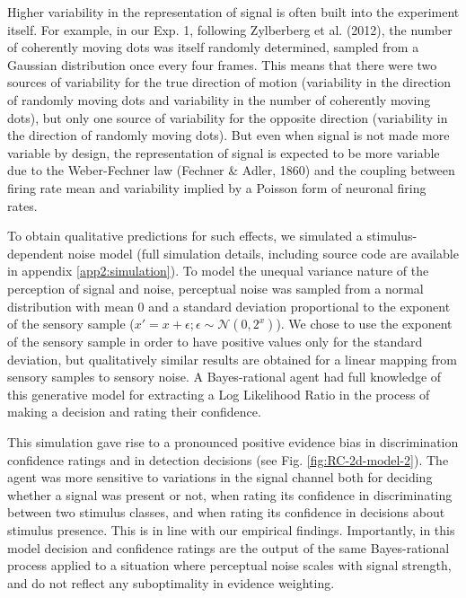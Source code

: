 \documentclass[12pt,twoside]{reedthesis}
\begin{document}
Higher variability in the representation of signal is often built into the experiment itself. For example, in our Exp. 1, following Zylberberg et al. (2012), the number of coherently moving dots was itself randomly determined, sampled from a Gaussian distribution once every four frames. This means that there were two sources of variability for the true direction of motion (variability in the direction of randomly moving dots and variability in the number of coherently moving dots), but only one source of variability for the opposite direction (variability in the direction of randomly moving dots). But even when signal is not made more variable by design, the representation of signal is expected to be more variable due to the Weber-Fechner law (Fechner \& Adler, 1860) and the coupling between firing rate mean and variability implied by a Poisson form of neuronal firing rates.

To obtain qualitative predictions for such effects, we simulated a stimulus-dependent noise model (full simulation details, including source code are available in appendix \ref{app2:simulation}). To model the unequal variance nature of the perception of signal and noise, perceptual noise was sampled from a normal distribution with mean 0 and a standard deviation proportional to the exponent of the sensory sample (\(x'=x+\epsilon; \epsilon \sim \mathcal{N}(0,2^x)\)). We chose to use the exponent of the sensory sample in order to have positive values only for the standard deviation, but qualitatively similar results are obtained for a linear mapping from sensory samples to sensory noise. A Bayes-rational agent had full knowledge of this generative model for extracting a Log Likelihood Ratio in the process of making a decision and rating their confidence.

This simulation gave rise to a pronounced positive evidence bias in discrimination confidence ratings and in detection decisions (see Fig. \ref{fig:RC-2d-model-2}). The agent was more sensitive to variations in the signal channel both for deciding whether a signal was present or not, when rating its confidence in discriminating between two stimulus classes, and when rating its confidence in decisions about stimulus presence. This is in line with our empirical findings. Importantly, in this model decision and confidence ratings are the output of the same Bayes-rational process applied to a situation where perceptual noise scales with signal strength, and do not reflect any suboptimality in evidence weighting.
\end{document}
